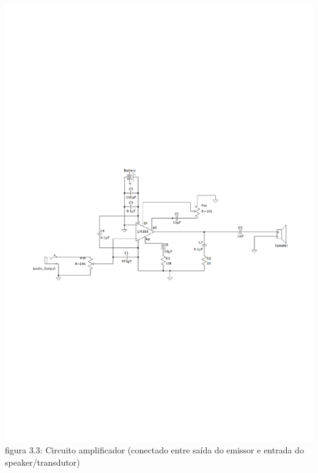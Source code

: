 \documentclass[11pt,a4paper]{report}
\begin{document}
\begin{center}
	\hspace*{-3.5cm}\includegraphics[clip, trim=0cm 10.0cm 0.0cm 10.0cm,width=1.7\linewidth]{amplifier_circuit.pdf}
	\footnotesize{figura 3.3: Circuito amplificador (conectado entre saída do emissor e entrada do speaker/transdutor)}
\end{center}
\end{document}

